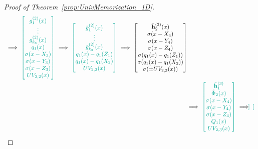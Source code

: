\documentclass{article}
\numberwithin{equation}{section}
\theoremstyle{definition}
\begin{document}
\begin{proof}[{Proof of Theorem~\ref{prop:UnivMemorization_1D}}]
\begin{align}
{    }
    \ \Longrightarrow \ 
    {\color{persiangreen}
    \begin{bmatrix}
        g_1^{(2)} (x)  \\  
        \vdots  \\  
        g_{k_3}^{(2)} (x)  \\
        q_1(x)  \\  
        \sigma(x - X_{3})  \\  
        \sigma(x - Y_{3})  \\
        \sigma(x - Z_{3})  \\
        UV_{2,2}(x)
    \end{bmatrix}
    }
    \ \Longrightarrow \ 
    {\color{persiangreen}
    \begin{bmatrix}
        \tilde{g}_1^{(2)} (x)  \\  
        \vdots  \\  
        \tilde{g}_{k_3}^{(2)} (x)  \\
        q_1(x) - q_1(Z_1)  \\
        q_1(x) - q_1(X_2)  \\
        UV_{2,3}(x)
    \end{bmatrix}
    }
    \ \Longrightarrow \
    \begin{bmatrix}
        \Bar{\mathbf{h}}_2^{(2)} (x)  \\
        \sigma(x - X_{4})  \\  
        \sigma(x - Y_{4})  \\
        \sigma(x - Z_{4})  \\
        \sigma( q_1(x) - q_1(Z_1) )  \\
        \sigma( q_1(x) - q_1(X_2) )  \\
        \sigma( \pm UV_{2,3}(x) ) 
    \end{bmatrix}
    \nonumber
    \\
    \ &\Longrightarrow \ 
    {\color{persiangreen}
    \begin{bmatrix} 
        \tilde{\mathbf{h}}_1^{(3)}  \\
        \tilde{\Phi}_2(x)  \\  
        \sigma(x - X_{4})  \\  
        \sigma(x - Y_{4})  \\
        \sigma(x - Z_{4})  \\
        Q_1(x)  \\
        UV_{2,3}(x)
    \end{bmatrix}
    }
    \ \Longrightarrow \ 
    {\color{persiangreen}
    \begin{bmatrix}

\end{bmatrix}}
\end{align}
\end{proof}
\end{document}
